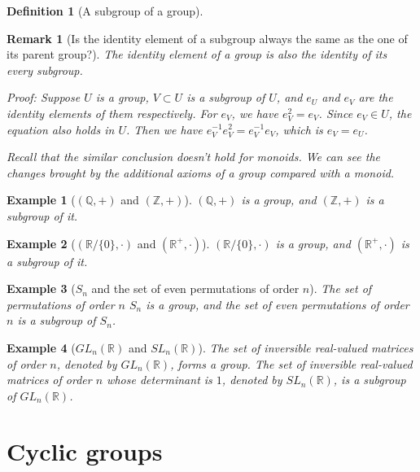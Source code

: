 \documentclass[onecolumn]{ctexart}
\newtheorem{definition}{Definition}
\newtheorem{remark}{Remark}
\newtheorem{example}{Example}
\begin{document}
\begin{definition}[A subgroup of a group]
  
\end{definition}
\begin{remark}[Is the identity element of a subgroup always the same as the one of its parent group?]
  The identity element of a group is also the identity of its every subgroup.

  Proof: Suppose $U$ is a group, $V \subset U$ is a subgroup of $U$, and $e_U$ 
  and $e_V$ are the identity elements of them respectively. For $e_V$, we have 
  $e_V^2 = e_V$. Since $e_V \in U$, the equation also holds in $U$. Then we have 
  $e_V^{-1} e_V^2 = e_V^{-1} e_V$, which is $e_V = e_U$.

  Recall that the similar conclusion doesn't hold for monoids. We can see the 
  changes brought by the additional axioms of a group compared with a monoid.
\end{remark}

\begin{example}[$(\mathbb{Q}, +)$ and $(\mathbb{Z}, +)$]
  $(\mathbb{Q}, +)$ is a group, and $(\mathbb{Z}, +)$ is a subgroup of it.
\end{example}

\begin{example}[$(\mathbb{R} \slash \lbrace 0 \rbrace, \cdot)$ and $(\mathbb{R}^+, \cdot)$]
  $(\mathbb{R} \slash \lbrace 0 \rbrace, \cdot)$ is a group, and $(\mathbb{R}^+, \cdot)$ is a subgroup of it.
\end{example}

\begin{example}[$S_n$ and the set of even permutations of order $n$]
  The set of permutations of order $n$ $S_n$ is a group, and the set of even permutations of order $n$ is a subgroup of $S_n$.
\end{example}

\begin{example}[$GL_n(\mathbb{R})$ and $SL_n(\mathbb{R})$]
  The set of inversible real-valued matrices of order $n$, denoted by 
  $GL_n(\mathbb{R})$, forms a group. The set of inversible real-valued matrices 
  of order $n$ whose determinant is $1$, denoted by $SL_n(\mathbb{R})$, is a 
  subgroup of $GL_n(\mathbb{R})$.
\end{example}

\section{Cyclic groups}
\end{document}
